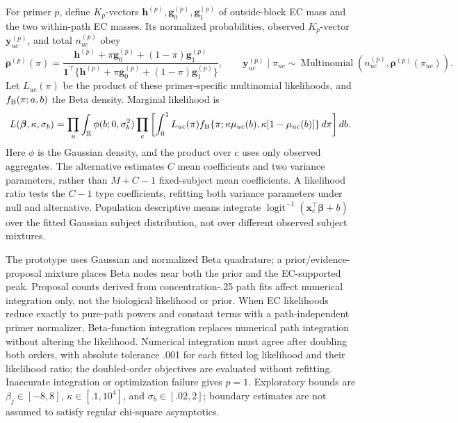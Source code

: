 \documentclass[11pt]{article}
\begin{document}
For primer \(p\), define \(K_p\)-vectors \(\mathbf h^{(p)},\mathbf g_0^{(p)},\mathbf g_1^{(p)}\) of outside-block EC mass and the two within-path EC masses. Its normalized probabilities, observed \(K_p\)-vector \(\mathbf y_{uc}^{(p)}\), and total \(n_{uc}^{(p)}\) obey \begin{equation}\boldsymbol\rho^{(p)}(\pi)=\frac{\mathbf h^{(p)}+\pi\mathbf g_0^{(p)}+(1-\pi)\mathbf g_1^{(p)}}{\mathbf1^\top\{\mathbf h^{(p)}+\pi\mathbf g_0^{(p)}+(1-\pi)\mathbf g_1^{(p)}\}},\qquad \mathbf y_{uc}^{(p)}\mid\pi_{uc}\sim\operatorname{Multinomial}(n_{uc}^{(p)},\boldsymbol\rho^{(p)}(\pi_{uc})).\end{equation} Let \(L_{uc}(\pi)\) be the product of these primer-specific multinomial likelihoods, and \(f_{\rm B}(\pi;a,b)\) the Beta density. Marginal likelihood is \begin{equation}L(\boldsymbol\beta,\kappa,\sigma_b)=\prod_u\int_{\mathbb R}\phi(b;0,\sigma_b^2)\prod_c\left[\int_0^1L_{uc}(\pi)f_{\rm B}\{\pi;\kappa\mu_{uc}(b),\kappa[1-\mu_{uc}(b)]\}\,d\pi\right]db.\end{equation} Here \(\phi\) is the Gaussian density, and the product over \(c\) uses only observed aggregates. The alternative estimates \(C\) mean coefficients and two variance parameters, rather than \(M+C-1\) fixed-subject mean coefficients. A likelihood ratio tests the \(C-1\) type coefficients, refitting both variance parameters under null and alternative. Population descriptive means integrate \(\operatorname{logit}^{-1}(\mathbf x_c^\top\boldsymbol\beta+b)\) over the fitted Gaussian subject distribution, not over different observed subject mixtures.

The prototype uses Gaussian and normalized Beta quadrature; a prior/evidence-proposal mixture places Beta nodes near both the prior and the EC-supported peak. Proposal counts derived from concentration-.25 path fits affect numerical integration only, not the biological likelihood or prior. When EC likelihoods reduce exactly to pure-path powers and constant terms with a path-independent primer normalizer, Beta-function integration replaces numerical path integration without altering the likelihood. Numerical integration must agree after doubling both orders, with absolute tolerance .001 for each fitted log likelihood and their likelihood ratio; the doubled-order objectives are evaluated without refitting. Inaccurate integration or optimization failure gives \(p=1\). Exploratory bounds are \(\beta_j\in[-8,8]\), \(\kappa\in[.1,10^4]\), and \(\sigma_b\in[.02,2]\); boundary estimates are not assumed to satisfy regular chi-square asymptotics.
\end{document}
